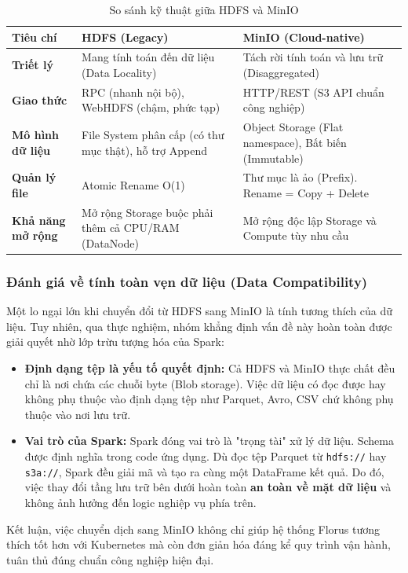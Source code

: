 \begin{table}[H]
    \centering
    \renewcommand{\arraystretch}{1.5} %
    \caption{So sánh kỹ thuật giữa HDFS và MinIO}
    \label{tab:hdfs-vs-minio}
    \begin{tabularx}{\textwidth}{@{}l X X@{}} %
        \toprule
        \textbf{Tiêu chí} & \textbf{HDFS (Legacy)} & \textbf{MinIO (Cloud-native)} \\
        \midrule
        
        \textbf{Triết lý} & Mang tính toán đến dữ liệu (Data Locality) & Tách rời tính toán và lưu trữ (Disaggregated) \\
        
        \textbf{Giao thức} & RPC (nhanh nội bộ), WebHDFS (chậm, phức tạp) & HTTP/REST (S3 API chuẩn công nghiệp) \\
        
        \textbf{Mô hình dữ liệu} & File System phân cấp (có thư mục thật), hỗ trợ Append & Object Storage (Flat namespace), Bất biến (Immutable) \\
        
        \textbf{Quản lý file} & Atomic Rename O(1) & Thư mục là ảo (Prefix). Rename = Copy + Delete \\
        
        \textbf{Khả năng mở rộng} & Mở rộng Storage buộc phải thêm cả CPU/RAM (DataNode) & Mở rộng độc lập Storage và Compute tùy nhu cầu \\
        
        \bottomrule
    \end{tabularx}
\end{table}

\subsubsection{Đánh giá về tính toàn vẹn dữ liệu (Data Compatibility)}
Một lo ngại lớn khi chuyển đổi từ HDFS sang MinIO là tính tương thích của dữ liệu. Tuy nhiên, qua thực nghiệm, nhóm khẳng định vấn đề này hoàn toàn được giải quyết nhờ lớp trừu tượng hóa của Spark:
\begin{itemize}
    \item \textbf{Định dạng tệp là yếu tố quyết định:} Cả HDFS và MinIO thực chất đều chỉ là nơi chứa các chuỗi byte (Blob storage). Việc dữ liệu có đọc được hay không phụ thuộc vào định dạng tệp như Parquet, Avro, CSV chứ không phụ thuộc vào nơi lưu trữ.
    \item \textbf{Vai trò của Spark:} Spark đóng vai trò là "trọng tài" xử lý dữ liệu. Schema được định nghĩa trong code ứng dụng. Dù đọc tệp Parquet từ \texttt{hdfs://} hay \texttt{s3a://}, Spark đều giải mã và tạo ra cùng một DataFrame kết quả. Do đó, việc thay đổi tầng lưu trữ bên dưới hoàn toàn \textbf{an toàn về mặt dữ liệu} và không ảnh hưởng đến logic nghiệp vụ phía trên.
\end{itemize}

Kết luận, việc chuyển dịch sang MinIO không chỉ giúp hệ thống Florus tương thích tốt hơn với Kubernetes mà còn đơn giản hóa đáng kể quy trình vận hành, tuân thủ đúng chuẩn công nghiệp hiện đại.